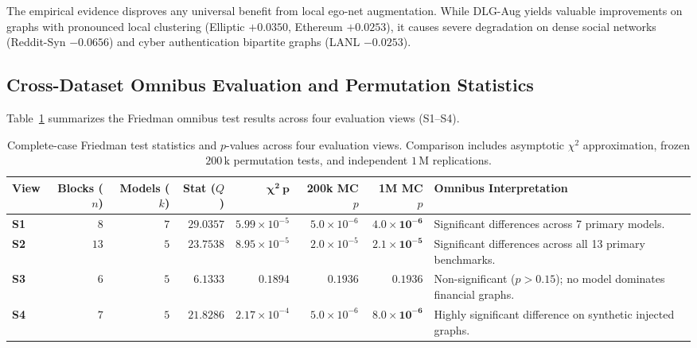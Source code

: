 \documentclass[applsci,article,submit,moreauthors,pdftex]{Definitions/mdpi}
\begin{document}
The empirical evidence disproves any universal benefit from local ego-net augmentation. While DLG-Aug yields valuable improvements on graphs with pronounced local clustering (Elliptic $+0.0350$, Ethereum $+0.0253$), it causes severe degradation on dense social networks (Reddit-Syn $-0.0656$) and cyber authentication bipartite graphs (LANL $-0.0253$).

\subsection{Cross-Dataset Omnibus Evaluation and Permutation Statistics}
Table~\ref{tab:friedman_stats} summarizes the Friedman omnibus test results across four evaluation views (S1--S4).

\begin{table}[htbp]
\centering\footnotesize\setlength{\tabcolsep}{3.5pt}
\caption{Complete-case Friedman test statistics and $p$-values across four evaluation views. Comparison includes asymptotic $\chi^2$ approximation, frozen $200\,\mathrm{k}$ permutation tests, and independent $1\,\mathrm{M}$ replications.}
\label{tab:friedman_stats}
\begin{tabularx}{\textwidth}{lrrrrrr>{\raggedright\arraybackslash}X}\toprule
\textbf{View} & \textbf{Blocks ($n$)} & \textbf{Models ($k$)} & \textbf{Stat ($Q$)} & $\mathbf{\chi^2\ p}$ & \textbf{200k MC $p$} & \textbf{1M MC $p$} & \textbf{Omnibus Interpretation} \\\midrule
\textbf{S1} & $8$ & $7$ & $29.0357$ & $5.99 \times 10^{-5}$ & $5.0 \times 10^{-6}$ & $\mathbf{4.0 \times 10^{-6}}$ & Significant differences across 7 primary models. \\
\textbf{S2} & $13$ & $5$ & $23.7538$ & $8.95 \times 10^{-5}$ & $2.0 \times 10^{-5}$ & $\mathbf{2.1 \times 10^{-5}}$ & Significant differences across all 13 primary benchmarks. \\
\textbf{S3} & $6$ & $5$ & $6.1333$ & $0.1894$ & $0.1936$ & $\mathbf{0.1936}$ & Non-significant ($p > 0.15$); no model dominates financial graphs. \\
\textbf{S4} & $7$ & $5$ & $21.8286$ & $2.17 \times 10^{-4}$ & $5.0 \times 10^{-6}$ & $\mathbf{8.0 \times 10^{-6}}$ & Highly significant difference on synthetic injected graphs. \\\bottomrule
\end{tabularx}
\end{table}
\end{document}
